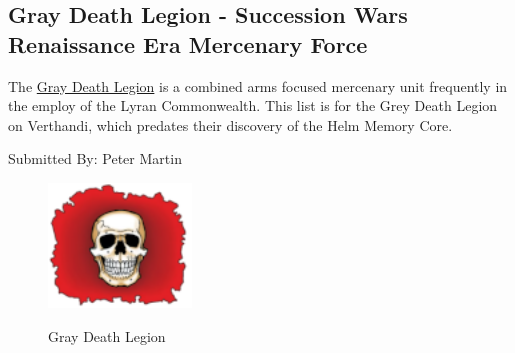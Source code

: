 \subsection{Gray Death Legion - Succession Wars Renaissance Era Mercenary Force}

The \href{https://www.sarna.net/wiki/Gray_Death_Legion}{Gray Death Legion} is a combined arms focused mercenary unit frequently in the employ of the Lyran Commonwealth.
This list is for the Grey Death Legion on Verthandi, which predates their discovery of the Helm Memory Core.

Submitted By: Peter Martin

\begin{figure}[!h]
  \centering
  \includegraphics[alt='Gray Death Legion Logo', width=1.5in, height=1.306in]{img/Gray-Death-Legion.png}
  \caption*{Gray Death Legion}
\end{figure}

